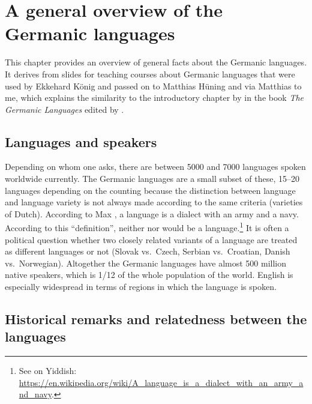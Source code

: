 \chapter{A general overview of the Germanic languages}

This chapter provides an overview of general facts about the Germanic languages. It derives from
slides for teaching courses about Germanic languages that were used by Ekkehard König and passed on
to Matthias Hüning and via Matthias to me, which explains the similarity to the introductory
chapter by \citet{HvDA94a} in the book \emph{The Germanic Languages} edited by \citet{KvdA94a-ed}.



\section{Languages and speakers}

Depending on whom one asks, there are between 5000 and 7000 languages spoken worldwide currently. The
Germanic languages are a small subset of these, 15--20 languages depending on the counting because the distinction between language and language variety is not always made according to the same criteria (\eg varieties of Dutch). 
According to Max \citet[]{Weinreich45a-u}, a language is a dialect with an army and a
navy. According to this ``definition'', neither  nor  would be a language.\footnote{%
See \citet[]{Weinreich45a-u} on Yiddish: \url{https://en.wikipedia.org/wiki/A_language_is_a_dialect_with_an_army_and_navy}.
} 
It is often a political question whether two closely related variants of a language are treated as different languages or not (Slovak vs.\ Czech, Serbian vs.\ Croatian, Danish vs.\ Norwegian).
Altogether the Germanic languages have almost 500 million native speakers, which is 1/12 of the whole population of
the world. English is especially widespread in terms of regions in which the language is spoken.


\section{Historical remarks and relatedness between the languages}


